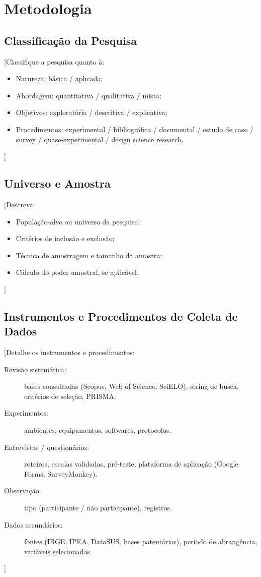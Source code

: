 \documentclass[
  12pt,
  a4paper,
  oneside,
  english,      %
  brazil
]{article}
\begin{document}
\newpage
\section{Metodologia}

\subsection{Classificação da Pesquisa}

[Classifique a pesquisa quanto à:
\begin{itemize}
  \item Natureza: básica / aplicada;
  \item Abordagem: quantitativa / qualitativa / mista;
  \item Objetivos: exploratória / descritiva / explicativa;
  \item Procedimentos: experimental / bibliográfica / documental /
        estudo de caso / survey / quase-experimental / design science research.
\end{itemize}]

\subsection{Universo e Amostra}

[Descreva:
\begin{itemize}
  \item População-alvo ou universo da pesquisa;
  \item Critérios de inclusão e exclusão;
  \item Técnica de amostragem e tamanho da amostra;
  \item Cálculo do poder amostral, se aplicável.
\end{itemize}]

\subsection{Instrumentos e Procedimentos de Coleta de Dados}

[Detalhe os instrumentos e procedimentos:

\begin{description}
  \item[Revisão sistemática:] bases consultadas (Scopus, Web of Science,
        SciELO), string de busca, critérios de seleção, PRISMA.
  \item[Experimentos:] ambientes, equipamentos, softwares, protocolos.
  \item[Entrevistas / questionários:] roteiros, escalas validadas,
        pré-teste, plataforma de aplicação (Google Forms, SurveyMonkey).
  \item[Observação:] tipo (participante / não participante), registros.
  \item[Dados secundários:] fontes (IBGE, IPEA, DataSUS, bases
        patentárias), período de abrangência, variáveis selecionadas.
\end{description}]
\end{document}
